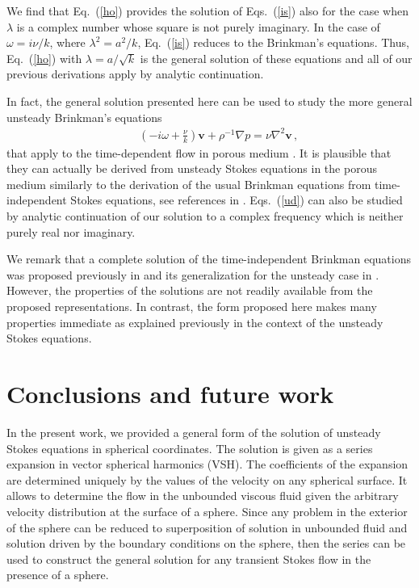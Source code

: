 \documentclass[aps,prx,twocolumn,amsmath,amssymb,amsfonts]{revtex4-2}
\begin{document}
{{We find that Eq.~(\ref{ho}) provides the solution of Eqs.~(\ref{is}) also for the case when $\lambda$ is a complex number whose square is not purely imaginary. In the case of $\omega=i\nu/k$, where $\lambda^2=a^2/k$, Eq.~(\ref{is}) reduces to the Brinkman's equations. Thus, Eq.~(\ref{ho}) with $\lambda=a/\sqrt{k}$ is the general solution of these equations and all of our previous derivations apply by analytic continuation.

In fact, the general solution presented here can be used to study the more general unsteady Brinkman's equations
\begin{eqnarray}&&\!\!\!\!
\left(-i\omega+\frac{\nu}{k}\right) \bm v+\rho^{-1} \nabla p=\nu\nabla^2\bm v\,, \label{ud}
\end{eqnarray}
that apply to the time-dependent flow in porous medium \cite{cos}. It is plausible that they can actually be derived from unsteady Stokes equations in the porous medium similarly to the derivation of the usual Brinkman equations from time-independent Stokes equations, see references in \cite{dru}. Eqs.~(\ref{ud}) can also be studied by analytic continuation of our solution to a complex frequency which is neither purely real nor imaginary.

We remark that a complete solution of the time-independent Brinkman equations was proposed previously in \cite{sek} and its generalization for the unsteady case in \cite{cos}. However, the properties of the solutions are not readily available from the proposed representations. In contrast, the form proposed here makes many properties immediate as explained previously in the context of the unsteady Stokes equations.


\section{Conclusions and future work}

In the present work, we provided a general form of the solution of unsteady Stokes equations in spherical coordinates. The solution is given as a series expansion in vector spherical harmonics (VSH). The coefficients of the expansion are determined uniquely by the values of the velocity on any spherical surface. It allows to determine the flow in the unbounded viscous fluid given the arbitrary velocity distribution at the surface of a sphere. Since any problem in the exterior of the sphere can be reduced to superposition of solution in unbounded fluid and solution driven by the boundary conditions on the sphere, then the series can be used to construct the general solution for any transient Stokes flow in the presence of a sphere.

}}
\end{document}
